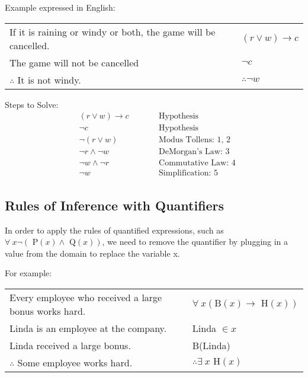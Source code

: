 Example expressed in English:
\begin{center}
  \begin{tabular}{lrl}
    If it is raining or windy or both, the game will be cancelled. &  & $(r \lor w) \rightarrow c$ \\
    The game will not be cancelled                                 &  & $\lnot c$               \\
    \hhline{-~-}
    $\therefore$ It is not windy.                                  &  & $\therefore \lnot w$
  \end{tabular}

  Steps to Solve:
  \begin{align}
     & (r \lor w) \rightarrow c &  & \qquad \text{Hypothesis}          \\
     & \lnot c               &  & \qquad \text{Hypothesis}          \\
     & \lnot (r \lor w)      &  & \qquad \text{Modus Tollens: 1, 2} \\
     & \lnot r \land \lnot w &  & \qquad \text{DeMorgan's Law: 3}   \\
     & \lnot w \land \lnot r &  & \qquad \text{Commutative Law: 4}  \\
     & \lnot w               &  & \qquad \text{Simplification: 5}
  \end{align}
\end{center}

\subsection{Rules of Inference with Quantifiers}

In order to apply the rules of quantified expressions, such as $\forall~ x \lnot (\text{ P}(x) \land \text{ Q}(x))$,
we need to remove the quantifier by plugging in a value from the domain to replace the variable x.

For example:
\begin{center}
  \begin{tabular}{lrl}
    Every employee who received a large bonus works hard. &  & $\forall~ x (\text{B}(x) \rightarrow \text{ H}(x))$ \\
    Linda is an employee at the company.                  &  & Linda $\in x$                                   \\
    Linda received a large bonus.                         &  & B(Linda)                                        \\
    \hhline{-~-}
    $\therefore$ Some employee works hard.                &  & $\therefore \exists~ x \text{ H}(x)$
  \end{tabular}
\end{center}

